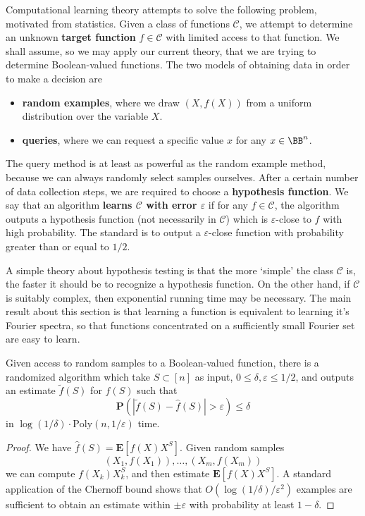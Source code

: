 Computational learning theory attempts to solve the following problem, motivated from statistics. Given a class of functions $\mathcal{C}$, we attempt to determine an unknown {\bf target function} $f \in \mathcal{C}$ with limited access to that function. We shall assume, so we may apply our current theory, that we are trying to determine Boolean-valued functions. The two models of obtaining data in order to make a decision are
%
\begin{itemize}
    \item {\bf random examples}, where we draw $(X,f(X))$ from a uniform distribution over the variable $X$.
    \item {\bf queries}, where we can request a specific value $x$ for any $x \in \BB^n$.
\end{itemize}
%
The query method is at least as powerful as the random example method, because we can always randomly select samples ourselves. After a certain number of data collection steps, we are required to choose a {\bf hypothesis function}. We say that an algorithm {\bf learns $\mathcal{C}$ with error $\varepsilon$} if for any $f \in \mathcal{C}$, the algorithm outputs a hypothesis function (not necessarily in $\mathcal{C}$) which is $\varepsilon$-close to $f$ with high probability. The standard is to output a $\varepsilon$-close function with probability greater than or equal to $1/2$.

A simple theory about hypothesis testing is that the more `simple' the class $\mathcal{C}$ is, the faster it should be to recognize a hypothesis function. On the other hand, if $\mathcal{C}$ is suitably complex, then exponential running time may be necessary. The main result about this section is that learning a function is equivalent to learning it's Fourier spectra, so that functions concentrated on a sufficiently small Fourier set are easy to learn.

\begin{theorem}
    Given access to random samples to a Boolean-valued function, there is a randomized algorithm which take $S \subset [n]$ as input, $0 \leq \delta, \varepsilon \leq 1/2$, and outputs an estimate $\widetilde{f}(S)$ for $\widehat{f}(S)$ such that
    \[ \mathbf{P}(|\widetilde{f}(S) - \widehat{f}(S)| > \varepsilon) \leq \delta \]
    in $\log(1/\delta) \cdot \text{Poly}(n, 1/\varepsilon)$ time.
\end{theorem}
\begin{proof}
    We have $\widehat{f}(S) = \mathbf{E}[f(X) X^S]$. Given random samples
    \[ (X_1, f(X_1)), \dots, (X_m, f(X_m)) \]
    we can compute $f(X_k)X_k^S$, and then estimate $\mathbf{E}[f(X) X^S]$. A standard application of the Chernoff bound shows that $O(\log(1/\delta)/\varepsilon^2)$ examples are sufficient to obtain an estimate within $\pm \varepsilon$ with probability at least $1 - \delta$.
\end{proof}

